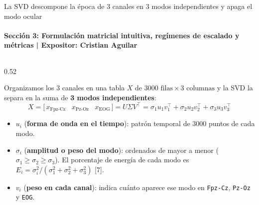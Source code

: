 \documentclass[aspectratio=169,9pt]{beamer}
\begin{document}
\begin{frame}{La SVD descompone la \'epoca de 3 canales en 3 modos independientes y apaga el modo ocular}
  \framesubtitle{Secci\'on 3: Formulaci\'on matricial intuitiva, reg\'imenes de escalado y m\'etricas | Expositor: Cristian Aguilar}

  \begin{columns}[T,onlytextwidth]
    \begin{column}{0.52\textwidth}
      \begin{tcolorbox}[navycard, title={\scriptsize\bfseries ?`C\'omo funciona la SVD en cada \'epoca de 30 s? ($3000\text{ muestras}\times 3\text{ canales}$)}, colbacktitle=UDNavy, coltitle=white]
        \scriptsize
        \setlength{\abovedisplayskip}{3pt}\setlength{\belowdisplayskip}{3pt}
        Organizamos los 3 canales en una tabla $X$ de $3000\text{ filas}\times 3\text{ columnas}$ y la SVD la separa en la suma de \textbf{3 modos independientes}:
        \[
          X = \big[\, x_{\text{Fpz-Cz}} \;\;\; x_{\text{Pz-Oz}} \;\;\; x_{\text{EOG}} \,\big] = U \Sigma V^\top = \sigma_1 u_1 v_1^\top + \sigma_2 u_2 v_2^\top + \sigma_3 u_3 v_3^\top
        \]
        \begin{itemize}\scriptsize\setlength{\itemsep}{1pt}
          \item $u_i$ (\textbf{forma de onda en el tiempo}): patr\'on temporal de $3000$ puntos de cada modo.
          \item $\sigma_i$ (\textbf{amplitud o peso del modo}): ordenados de mayor a menor ($\sigma_1 \ge \sigma_2 \ge \sigma_3$). El porcentaje de energ\'ia de cada modo es $E_i = \sigma_i^2 / (\sigma_1^2 + \sigma_2^2 + \sigma_3^2)$ [7].
          \item $v_i$ (\textbf{peso en cada canal}): indica cu\'anto aparece ese modo en \texttt{Fpz-Cz}, \texttt{Pz-Oz} y \texttt{EOG}.
        \end{itemize}
      \end{tcolorbox}

      \vspace{0.04cm}


\end{column}
\end{columns}
\end{frame}
\end{document}
